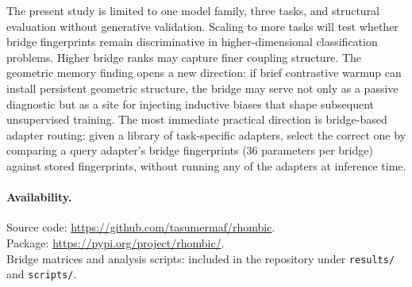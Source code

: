 The present study is limited to one model family, three tasks, and
structural evaluation without generative validation. Scaling to more
tasks will test whether bridge fingerprints remain discriminative in
higher-dimensional classification problems. Higher bridge ranks may
capture finer coupling structure. The geometric memory finding opens
a new direction: if brief contrastive warmup can install persistent
geometric structure, the bridge may serve not only as a passive
diagnostic but as a site for injecting inductive biases that shape
subsequent unsupervised training. The most immediate practical
direction is bridge-based adapter routing: given a library of
task-specific adapters, select the correct one by comparing a query
adapter's bridge fingerprints (36 parameters per bridge) against
stored fingerprints, without running any of the adapters at
inference time.

\paragraph{Availability.}
Source code: \url{https://github.com/tasumermaf/rhombic}.\\
Package: \url{https://pypi.org/project/rhombic/}.\\
Bridge matrices and analysis scripts: included in the repository
under \texttt{results/} and \texttt{scripts/}.
